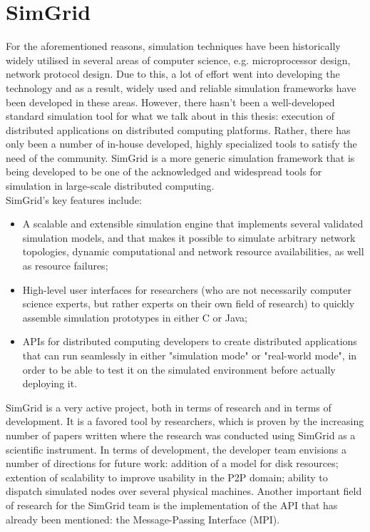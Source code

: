 \section{SimGrid}
For the aforementioned reasons, simulation techniques have been
historically widely utilised in several areas of computer science,
e.g. microprocessor design, network protocol design. Due to this, a
lot of effort went into developing the technology and as a result,
widely used and reliable simulation frameworks have been developed in
these areas. However, there hasn't been a well-developed standard
simulation tool for what we talk about in this thesis: execution of
distributed applications on distributed computing platforms. Rather,
there has only been a number of in-house developed, highly specialized
tools to satisfy the need of the community. SimGrid is a more generic
simulation framework that is being developed to be one of the
acknowledged and widespread tools for simulation in large-scale
distributed computing.\cite{clq08}\\
SimGrid's key features include:\cite{clq08}
\begin{itemize}
\item A scalable and extensible simulation engine that implements
  several validated simulation models, and that makes it possible to
  simulate arbitrary network topologies, dynamic computational and
  network resource availabilities, as well as resource failures;
\item High-level user interfaces for researchers (who are not
  necessarily computer science experts, but rather experts on their own
  field of research) to quickly assemble simulation prototypes in either
  C or Java;
\item APIs for distributed computing developers to create distributed
  applications that can run seamlessly in either "simulation mode" or
  "real-world mode", in order to be able to test it on the simulated
  environment before actually deploying it.
\end{itemize}
SimGrid is a very active project, both in terms of research and in
terms of development. It is a favored tool by researchers, which is
proven by the increasing number of papers written where the research
was conducted using SimGrid as a scientific instrument. In terms of
development, the developer team envisions a number of directions for
future work: addition of a model for disk resources; extention of
scalability to improve usability in the P2P domain; ability to
dispatch simulated nodes over several physical machines.\cite{clq08}
Another important field of research for the SimGrid team is the
implementation of the API that has already been mentioned: the
Message-Passing Interface (MPI).
